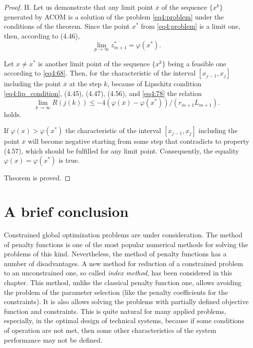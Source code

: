 \begin{proof}
  II. Let us demonstrate that any limit point $\overline x$ of the sequence $\{x^k\}$ generated by ACOM is a solution of the problem \eqref{eq4:problem} under the conditions of the theorem. Since the point $x^*$ from \eqref{eq4:problem} is a limit one, then, according to (4.46),
  \begin{equation}
    \label{eq4:78}
    \lim_{p\to\infty}z^*_{m+1}=\varphi(x^*).
  \end{equation}

  Let $x\not=x^*$ is another limit point of the sequence $\{x^k\}$ being a feasible one according to \eqref{eq4:68}. Then, for the characteristic of the interval $[x_{j-1},x_j]$ including the point $\overline x$ at the step $k$, because of Lipschitz condition \eqref{eq4:lip_condition}, (4.45), (4.47), (4.56), and \eqref{eq4:78} the relation
  \begin{displaymath}
    \lim_{k\to\infty}R(j(k))\le-4(\varphi(\overline x)-\varphi(x^*))/(r_{m+1}L_{m+1}).
  \end{displaymath}
  holds.

  If $\varphi(x)>\varphi(x^*)$ the characteristic of the interval $[x_{j-1},x_j]$ including the point $\overline x$ will become negative starting from some step that contradicts to property (4.57), which should be fulfilled for any limit point. Consequently, the equality $\varphi(x)=\varphi(x^*)$  is true.

  Theorem is proved.
\end{proof}

\section*{A brief conclusion}
Constrained global optimization problems are under consideration. The method of penalty functions is one of the most popular numerical methods for solving the problems of this kind. Nevertheless, the method of penalty functions has a number of disadvantages. A new method for reduction of a constrained problem to an unconstrained one, so called \emph{index method}, has been considered in this chapter. This method, unlike the classical penalty function one, allows avoiding the problem of the parameter selection (like the penalty coefficients for the constraints). It is also allows solving the problems with partially defined objective function and constraints. This is quite natural for many applied problems, especially, in the optimal design of technical systems, because if some conditions of operation are not met, then some other characteristics of the system performance may not be defined.

